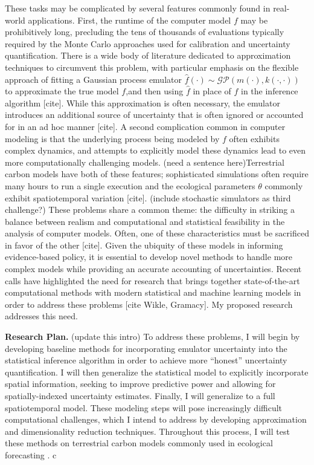 \documentclass[12pt]{article}
\begin{document}
These tasks may be complicated by several features commonly found in real-world applications. First, the runtime of the computer model $f$ may be prohibitively long, 
precluding the tens of thousands of evaluations typically required by the Monte Carlo approaches used for calibration and uncertainty quantification. There is a wide body 
of literature dedicated to approximation techniques to circumvent this problem, with particular emphasis on the flexible approach of fitting a Gaussian process 
emulator $\hat{f}(\cdot) \sim \mathcal{GP}(m(\cdot), k(\cdot, \cdot))$ to approximate the true model $f$,and then using $\hat{f}$
in place of $f$ in the inference algorithm [cite]. While this approximation is often necessary, the emulator introduces an additional source of uncertainty that is often ignored 
or accounted for in an ad hoc manner [cite]. A second complication common in computer modeling is that the 
underlying process being modeled by $f$ often exhibits complex dynamics, and attempts to explicitly model these dynamics lead to even more computationally challenging
models. (need a sentence here)Terrestrial carbon models have both of these features; sophisticated simulations often require many hours to run a single execution \cite{Fer} and the ecological 
parameters $\theta$ commonly exhibit spatiotemporal variation [cite]. (include stochastic simulators as third challenge?) These problems share a common theme: the difficulty in striking 
a balance between realism and computational and statistical feasibility in the analysis of computer models. Often, one of these characteristics must be sacrificed in favor of the other [cite].
Given the ubiquity of these models in informing evidence-based policy, it is essential to develop novel methods to handle more complex models while providing
an accurate accounting of uncertainties. 
Recent calls have highlighted the need for research that brings together state-of-the-art computational methods with modern statistical and machine learning models in order to 
address these problems [cite Wikle, Gramacy]. My proposed research addresses this need. 

\noindent
\textbf{Research Plan.} (update this intro) To address these problems, I will begin by developing baseline methods for incorporating emulator uncertainty into the statistical inference algorithm in order to achieve more ``honest'' uncertainty quantification. I will then generalize the statistical model to explicitly incorporate spatial information, seeking to improve predictive power and allowing for spatially-indexed uncertainty estimates. Finally, I will generalize to a full spatiotemporal model. These modeling steps will pose increasingly difficult computational challenges, which I intend to address by developing approximation and dimensionality reduction techniques. Throughout this process, I will test these methods on terrestrial carbon models commonly used in ecological forecasting \cite{Dietze}. 
 c
 
\end{document}
